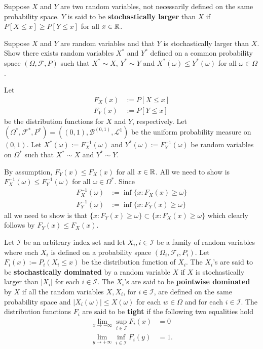 Suppose $X$ and $Y$ are two random variables, not necessarily defined on the same probability space. $Y$ is said to be {\bf stochastically larger} than $X$ if $P[X\leq x]\geq P[Y\leq x]$ for all $x\in \Bbb R$.

\begin{exercise}
Suppose $X$ and $Y$ are random variables and that $Y$ is stochastically larger than $X$. Show there exists random variables $X^*$ and $Y^*$ defined on a common probability space $(\Omega, \mathcal F, P)$ such that $X^*\sim X$, $Y^*\sim Y$ and $X^*(\omega)\leq Y^*(\omega)$ for all $\omega\in \Omega$.
\end{exercise}
\begin{exerciseproof}
Let
\begin{align*}
F_X(x)&:=P[X\leq x] \\
F_Y(x)&:=P[Y\leq x]
\end{align*}
be the distribution functions for $X$ and $Y$, respectively. Let $(\Omega^*, \mathcal F^*, P^*) = ((0,1), \mathcal B^{(0,1)}, \mathcal L^1)$ be the uniform probability measure on $(0,1)$. Let $X^*(\omega) :=F_X^{-1}(\omega)$ and $Y^*(\omega):= F_Y^{-1}(\omega)$ be random variables on $\Omega^*$ such that $X^*\sim X$ and $Y^*\sim Y$.

By assumption, $F_Y(x)\leq F_X(x)$ for all $x\in\Bbb R$. All we need to show is $F_X^{-1}(\omega)\leq F^{-1}_Y(\omega)$ for all $\omega\in \Omega^*$. Since
\begin{align*}
F_X^{-1}(\omega)&:=\inf\{x: F_X(x)\geq \omega \} \\
F_Y^{-1}(\omega)&:=\inf\{x: F_Y(x)\geq \omega \}
\end{align*}
all we need to show is that $\{x: F_Y(x)\geq \omega \} \subset \{x: F_X(x)\geq \omega \}$ which clearly follows by $F_Y(x)\leq F_X(x)$.
\end{exerciseproof}



Let $\mathcal I$ be an arbitrary index set and let $X_i, i\in \mathcal I$ be a family of random variables where each $X_i$ is defined on a probability space $(\Omega_i, \mathcal F_i, P_i)$. Let $F_i(x):= P_i(X_i\leq x)$ be the distribution function of $X_i$. The $X_i$'s  are said to be {\bf stochastically dominated} by a random variable $X$ if $X$ is stochastically larger than $|X_i|$ for each $i\in \mathcal I$. The $X_i$'s are said to be {\bf pointwise dominated} by  $X$ if all the random variables $X, X_i$, for $i\in \mathcal I$, are defined on the same probability space and $|X_i(\omega)|\leq X(\omega)$ for each $w\in \Omega$ and for each $i\in \mathcal I$.
The distribution functions $F_i$ are said to be {\bf tight} if the following two equalities hold
\begin{align*}
\lim_{x\rightarrow-\infty} \sup_{i\in \mathcal I} F_i(x) &= 0 \\
\lim_{y\rightarrow+\infty} \inf_{i\in \mathcal I} F_i(y) &= 1.
\end{align*}

